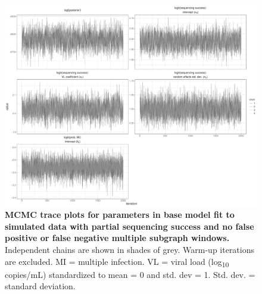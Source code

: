 \documentclass[10pt,letterpaper]{article}
\begin{document}
\begin{figure}[!ht]
 \includegraphics[width=1\textwidth]{../../figures/base_simulation_base_trace.pdf}
\caption{{\bf MCMC trace plots for parameters in base model fit to simulated data with partial sequencing success and no false positive or false negative multiple subgraph windows.} Independent chains are shown in shades of grey. Warm-up iterations are excluded. MI = multiple infection. VL = viral load (log\textsubscript{10} copies/mL) standardized to mean = 0 and std. dev = 1. Std. dev. = standard deviation.}
\end{figure}
\end{document}
